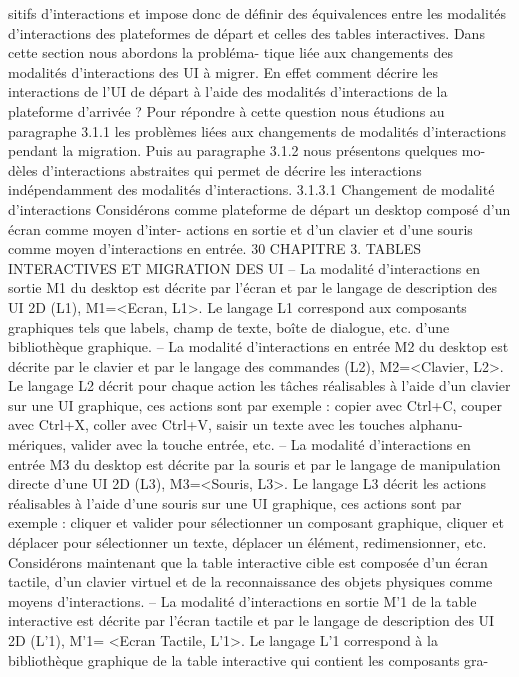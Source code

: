 \documentclass{article}
\begin{document}
sitifs d’interactions et impose donc de déﬁnir des équivalences entre les modalités d’interactions des
plateformes de départ et celles des tables interactives. Dans cette section nous abordons la probléma-
tique liée aux changements des modalités d’interactions des UI à migrer. En effet comment décrire les
interactions de l’UI de départ à l’aide des modalités d’interactions de la plateforme d’arrivée ? Pour
répondre à cette question nous étudions au paragraphe 3.1.1 les problèmes liées aux changements de
modalités d’interactions pendant la migration. Puis au paragraphe 3.1.2 nous présentons quelques mo-
dèles d’interactions abstraites qui permet de décrire les interactions indépendamment des modalités
d’interactions.
3.1.3.1
Changement de modalité d’interactions
Considérons comme plateforme de départ un desktop composé d’un écran comme moyen d’inter-
actions en sortie et d’un clavier et d’une souris comme moyen d’interactions en entrée.
30
CHAPITRE 3. TABLES INTERACTIVES ET MIGRATION DES UI
– La modalité d’interactions en sortie M1 du desktop est décrite par l’écran et par le langage
de description des UI 2D (L1), M1=<Ecran, L1>. Le langage L1 correspond aux composants
graphiques tels que labels, champ de texte, boîte de dialogue, etc. d’une bibliothèque graphique.
– La modalité d’interactions en entrée M2 du desktop est décrite par le clavier et par le langage
des commandes (L2), M2=<Clavier, L2>. Le langage L2 décrit pour chaque action les tâches
réalisables à l’aide d’un clavier sur une UI graphique, ces actions sont par exemple : copier
avec Ctrl+C, couper avec Ctrl+X, coller avec Ctrl+V, saisir un texte avec les touches alphanu-
mériques, valider avec la touche entrée, etc.
– La modalité d’interactions en entrée M3 du desktop est décrite par la souris et par le langage
de manipulation directe d’une UI 2D (L3), M3=<Souris, L3>. Le langage L3 décrit les actions
réalisables à l’aide d’une souris sur une UI graphique, ces actions sont par exemple : cliquer
et valider pour sélectionner un composant graphique, cliquer et déplacer pour sélectionner un
texte, déplacer un élément, redimensionner, etc.
Considérons maintenant que la table interactive cible est composée d’un écran tactile, d’un clavier
virtuel et de la reconnaissance des objets physiques comme moyens d’interactions.
– La modalité d’interactions en sortie M’1 de la table interactive est décrite par l’écran tactile
et par le langage de description des UI 2D (L’1), M’1= <Ecran Tactile, L’1>. Le langage L’1
correspond à la bibliothèque graphique de la table interactive qui contient les composants gra-
\end{document}
